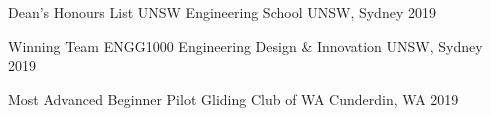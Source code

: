
\begin{cvhonors}

  \cvhonor
    {Dean's Honours List} %
    {UNSW Engineering School} %
    {UNSW, Sydney} %
    {2019} %

  \cvhonor
    {Winning Team} %
    {ENGG1000 Engineering Design \& Innovation} %
    {UNSW, Sydney} %
    {2019} %

  \cvhonor
    {Most Advanced Beginner Pilot} %
    {Gliding Club of WA} %
    {Cunderdin, WA} %
    {2019} %

\end{cvhonors}